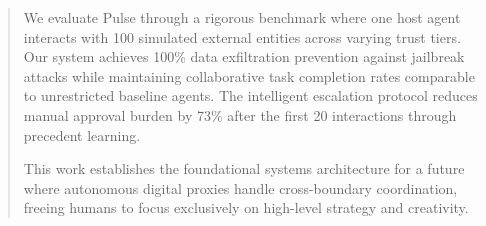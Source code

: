 \begin{abstract}
We evaluate Pulse through a rigorous benchmark where one host agent interacts with 100 simulated external entities across varying trust tiers. Our system achieves 100\% data exfiltration prevention against jailbreak attacks while maintaining collaborative task completion rates comparable to unrestricted baseline agents. The intelligent escalation protocol reduces manual approval burden by 73\% after the first 20 interactions through precedent learning.

This work establishes the foundational systems architecture for a future where autonomous digital proxies handle cross-boundary coordination, freeing humans to focus exclusively on high-level strategy and creativity.

\end{abstract}